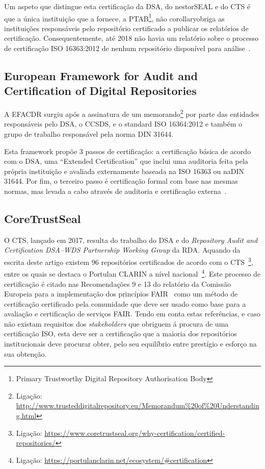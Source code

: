 \documentclass[sigconf,nonacm]{acmart}
\begin{document}
Um aspeto que distingue esta certificação da \gls{DSA}, do nestorSEAL e do \gls{CTS} é que a única instituição que a fornece, a PTAB\footnote{Primary Trustworthy Digital Repository Authorisation Body}, não corollaryobriga as instituições responsáveis pelo repositório certificado a publicar os relatórios de certificação. Consequentemente, até 2018 não havia um relatório sobre o processo de certificação \gls{ISO} 16363:2012 de nenhum repositório disponível para análise~\cite{Lindlar_Schwab_2019}.


\subsection{European Framework for Audit and Certification of Digital Repositories} %
\label{sub:european_framework_for_audit_and_certification_of_digital_repositories}

A \gls{EFACDR} surgiu após a assinatura de um memorando\footnote{Ligação: \url{http://www.trusteddigitalrepository.eu/Memorandum\%20of\%20Understanding.html}} por parte das entidades responsáveis pelo \gls{DSA}, o \gls{CCSDS}, e o standard \gls{ISO} 16364:2012 e também o grupo de trabalho responsável pela norma \gls{DIN} 31644.

Esta framework propõe 3 passos de certificação: a certificação básica de acordo com o \gls{DSA}, uma ``Extended Certification'' que inclui uma auditoria feita pela própria instituição e avaliada externamente baseada na \gls{ISO} 16363 ou na\gls{DIN} 31644. Por fim, o terceiro passo é certificação formal com base nas mesmas normas, mas levada a cabo através de auditoria e certificação externa~\cite{Lindlar_Schwab_2019}.


\subsection{CoreTrustSeal} %
\label{sub:core_trust_seal}

O \gls{CTS}, lançado em 2017, resulta do trabalho do \gls{DSA} e do \emph{Repository Audit and Certification DSA–WDS Partnership Working Group} da \gls{RDA}. Aquando da escrita deste artigo existem 96 repositórios certificados de acordo com o \gls{CTS}~\footnote{Ligação: \url{https://www.coretrustseal.org/why-certification/certified-repositories/}}, entre os quais se destaca o Portulan CLARIN a nível nacional~\footnote{Ligação: \url{https://portulanclarin.net/ecosystem/\#certification}}.
%
Este processo de certificação é citado nas Recomendações 9 e 13 do relatório da Comissão Europeia para a implementação dos princípios \gls{FAIR}~\cite{hodson2018turning} como um método de certificação certificado pela comunidade que deve ser usado como base para a avaliação e certificação de serviços \gls{FAIR}. Tendo em conta estas referências, e caso não existam requisitos dos \emph{stakeholders} que obriguem á procura de uma certificação ISO, esta deve ser a certificação que a maioria dos repositórios institucionais deve procurar obter, pelo seu equilíbrio entre prestígio e esforço na sua obtenção.
\end{document}
